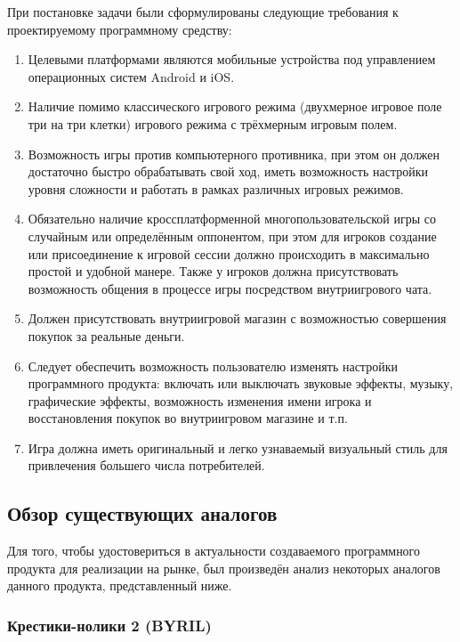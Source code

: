 При постановке задачи были сформулированы следующие требования к проектируемому программному средству:
\begin{enumerate}[label=\arabic*, itemindent=\parindent + 2.3ex]
    \item Целевыми платформами являются мобильные устройства под управлением операционных систем Android и iOS.
    \item Наличие помимо классического игрового режима (двухмерное игровое поле три на три клетки) игрового режима с трёхмерным игровым полем.
    \item Возможность игры против компьютерного противника, при этом он должен достаточно быстро обрабатывать свой ход, иметь возможность настройки уровня сложности и работать в рамках различных игровых режимов.
    \item Обязательно наличие кроссплатформенной многопользовательской игры со случайным или определённым оппонентом, при этом для игроков создание или присоединение к игровой сессии должно происходить в максимально простой и удобной манере. Также у игроков должна присутствовать возможность общения в процессе игры посредством внутриигрового чата.
    \item Должен присутствовать внутриигровой магазин с возможностью совершения покупок за реальные деньги.
    \item Следует обеспечить возможность пользователю изменять настройки программного продукта: включать или выключать звуковые эффекты, музыку, графические эффекты, возможность изменения имени игрока и восстановления покупок во внутриигровом магазине и т.п.
    \item Игра должна иметь оригинальный и легко узнаваемый визуальный стиль для привлечения большего числа потребителей.
\end{enumerate}


\subsection{Обзор существующих аналогов}

Для того, чтобы удостовериться в актуальности создаваемого программного продукта для реализации на рынке, был произведён анализ некоторых аналогов данного продукта, представленный ниже.


\subsubsection{Крестики-нолики 2 (BYRIL)}

